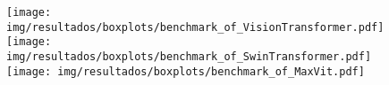\begin{figure}[h!]
	\texttt{[image: img/resultados/boxplots/benchmark\_of\_VisionTransformer.pdf]}
	\texttt{[image: img/resultados/boxplots/benchmark\_of\_SwinTransformer.pdf]}
	\texttt{[image: img/resultados/boxplots/benchmark\_of\_MaxVit.pdf]}
	\caption{}
	\label{fig:Time_of_Transformers}
\end{figure}
